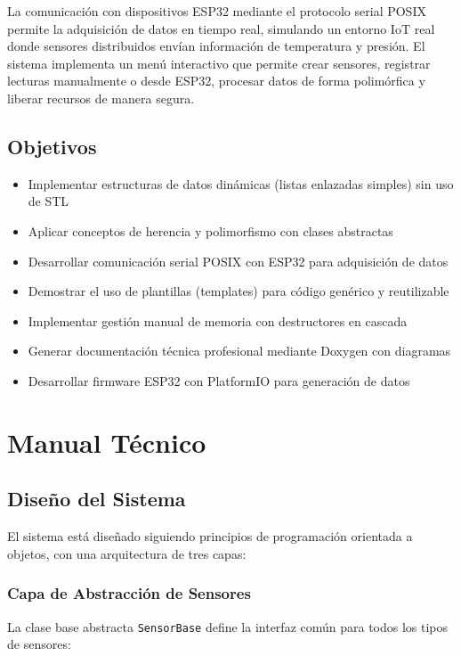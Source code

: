 \documentclass[conference]{IEEEtran}
\begin{document}
La comunicación con dispositivos ESP32 mediante el protocolo serial POSIX permite la adquisición de datos en tiempo real, simulando un entorno IoT real donde sensores distribuidos envían información de temperatura y presión. El sistema implementa un menú interactivo que permite crear sensores, registrar lecturas manualmente o desde ESP32, procesar datos de forma polimórfica y liberar recursos de manera segura.

\subsection{Objetivos}

\begin{itemize}
    \item Implementar estructuras de datos dinámicas (listas enlazadas simples) sin uso de STL
    \item Aplicar conceptos de herencia y polimorfismo con clases abstractas
    \item Desarrollar comunicación serial POSIX con ESP32 para adquisición de datos
    \item Demostrar el uso de plantillas (templates) para código genérico y reutilizable
    \item Implementar gestión manual de memoria con destructores en cascada
    \item Generar documentación técnica profesional mediante Doxygen con diagramas
    \item Desarrollar firmware ESP32 con PlatformIO para generación de datos
\end{itemize}

\section{Manual Técnico}

\subsection{Diseño del Sistema}

El sistema está diseñado siguiendo principios de programación orientada a objetos, con una arquitectura de tres capas:

\subsubsection{Capa de Abstracción de Sensores}

La clase base abstracta \texttt{SensorBase} define la interfaz común para todos los tipos de sensores:
\end{document}
